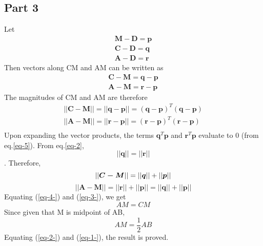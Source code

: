 \documentclass[journal,10pt,twocolumn]{article}
\begin{document}
\subsection*{Part 3}
Let
\begin{eqnarray}
	\boldsymbol{M-D} = \boldsymbol{p}\\
	\boldsymbol{C-D} = \boldsymbol{q}\\
	\boldsymbol{A-D} = \boldsymbol{r}
\end{eqnarray}
Then vectors along CM and AM can be written as
\begin{eqnarray}
	\boldsymbol{C-M} = \boldsymbol{q-p}\\
	\boldsymbol{A-M} = \boldsymbol{r-p}
\end{eqnarray}
The magnitudes of CM and AM are therefore
\begin{eqnarray}
	||\boldsymbol{C-M}|| = ||\boldsymbol{q-p}|| = (\boldsymbol{q-p})^T(\boldsymbol{q-p})\\
	||\boldsymbol{A-M}|| = ||\boldsymbol{r-p}|| = (\boldsymbol{r-p})^T(\boldsymbol{r-p})\\
\end{eqnarray}
Upon expanding the vector products, the terms $\boldsymbol{q}^T\boldsymbol{p}$ and $\boldsymbol{r}^T\boldsymbol{p}$ evaluate to 0 (from eq.\ref{eq-5}). From eq.\ref{eq-2}, $$||\boldsymbol{q}|| = ||\boldsymbol{r}||$$. Therefore,
\begin{equation}
||\boldsymbol{C-M}|| = ||\boldsymbol{q}|| + ||\boldsymbol{p}||\\
\label{eq-4-}
\end{equation}
\begin{equation}
||\boldsymbol{A-M}|| = ||\boldsymbol{r}|| + ||\boldsymbol{p}|| = ||\boldsymbol{q}|| + ||\boldsymbol{p}||
\label{eq-3-}
\end{equation}
Equating (\ref{eq-4-}) and (\ref{eq-3-}), we get
\begin{equation}
AM = CM
\label{eq-2-}
\end{equation}
Since given that M is midpoint of AB, 
\begin{equation}
AM = \frac{1}{2}AB
\label{eq-1-}
\end{equation}
Equating (\ref{eq-2-}) and (\ref{eq-1-}), the result is proved.
\end{document}
